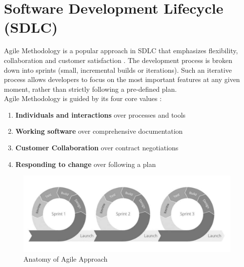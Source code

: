\chapter{Software Development Lifecycle (SDLC)}

Agile Methodology is a popular approach in SDLC that emphasizes flexibility, collaboration and customer satisfaction \cite{30} \cite{31}. The development process is broken down into sprints (small, incremental builds or iterations). Such an iterative process allows developers to focus on the most important features at any given moment, rather than strictly following a pre-defined plan. \\

Agile Methodology is guided by its four core values \cite{32}: 
\begin{enumerate}
    \item \textbf{Individuals and interactions} over processes and tools
    \item \textbf{Working software} over comprehensive documentation
    \item \textbf{Customer Collaboration} over contract negotiations
    \item \textbf{Responding to change} over following a plan 
\end{enumerate}


\begin{figure}
    \centering
    \includegraphics[width=1\linewidth]{images/sdlc.png}
    \caption{Anatomy of Agile Approach \cite{33}}
    \label{fig:sdlc}
\end{figure}




